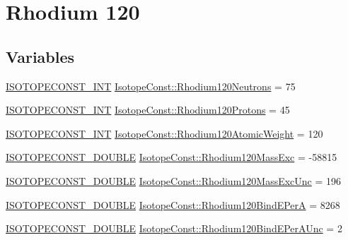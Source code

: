 \hypertarget{group___isotope_const-_rhodium-_rh120}{}\section{Rhodium 120}
\label{group___isotope_const-_rhodium-_rh120}
\subsection*{Variables}
\begin{DoxyCompactItemize}
\item 
\mbox{\hyperlink{group___isotope_const-_macros_ga5f18360b3e99483a35c32d789e62621c}{I\+S\+O\+T\+O\+P\+E\+C\+O\+N\+S\+T\+\_\+\+I\+NT}} \mbox{\hyperlink{group___isotope_const-_rhodium-_rh120_gaa931c9922b9efd69e71a940b9eb3238e}{Isotope\+Const\+::\+Rhodium120\+Neutrons}} = 75
\item 
\mbox{\hyperlink{group___isotope_const-_macros_ga5f18360b3e99483a35c32d789e62621c}{I\+S\+O\+T\+O\+P\+E\+C\+O\+N\+S\+T\+\_\+\+I\+NT}} \mbox{\hyperlink{group___isotope_const-_rhodium-_rh120_ga105a244346cec6cdd028fb87e3a375dc}{Isotope\+Const\+::\+Rhodium120\+Protons}} = 45
\item 
\mbox{\hyperlink{group___isotope_const-_macros_ga5f18360b3e99483a35c32d789e62621c}{I\+S\+O\+T\+O\+P\+E\+C\+O\+N\+S\+T\+\_\+\+I\+NT}} \mbox{\hyperlink{group___isotope_const-_rhodium-_rh120_ga7951dabf16cfcb8ceae2fe7a083d39cc}{Isotope\+Const\+::\+Rhodium120\+Atomic\+Weight}} = 120
\item 
\mbox{\hyperlink{group___isotope_const-_macros_ga8f45a7272ce02c0b4c65c44636ed719a}{I\+S\+O\+T\+O\+P\+E\+C\+O\+N\+S\+T\+\_\+\+D\+O\+U\+B\+LE}} \mbox{\hyperlink{group___isotope_const-_rhodium-_rh120_ga03137528f848cdad468aaf11ee21f8f3}{Isotope\+Const\+::\+Rhodium120\+Mass\+Exc}} = -\/58815
\item 
\mbox{\hyperlink{group___isotope_const-_macros_ga8f45a7272ce02c0b4c65c44636ed719a}{I\+S\+O\+T\+O\+P\+E\+C\+O\+N\+S\+T\+\_\+\+D\+O\+U\+B\+LE}} \mbox{\hyperlink{group___isotope_const-_rhodium-_rh120_ga74fe5109ee40ba93116dc1b4b3b69925}{Isotope\+Const\+::\+Rhodium120\+Mass\+Exc\+Unc}} = 196
\item 
\mbox{\hyperlink{group___isotope_const-_macros_ga8f45a7272ce02c0b4c65c44636ed719a}{I\+S\+O\+T\+O\+P\+E\+C\+O\+N\+S\+T\+\_\+\+D\+O\+U\+B\+LE}} \mbox{\hyperlink{group___isotope_const-_rhodium-_rh120_ga28e9f7fb510f004e4a617b27a2c7a9b7}{Isotope\+Const\+::\+Rhodium120\+Bind\+E\+PerA}} = 8268
\item 
\mbox{\hyperlink{group___isotope_const-_macros_ga8f45a7272ce02c0b4c65c44636ed719a}{I\+S\+O\+T\+O\+P\+E\+C\+O\+N\+S\+T\+\_\+\+D\+O\+U\+B\+LE}} \mbox{\hyperlink{group___isotope_const-_rhodium-_rh120_ga69ff83e2add6e0c719d2bf64a7590475}{Isotope\+Const\+::\+Rhodium120\+Bind\+E\+Per\+A\+Unc}} = 2

\end{DoxyCompactItemize}
